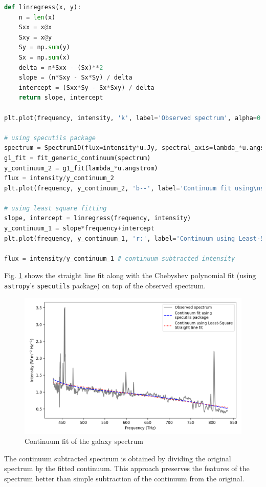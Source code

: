 \begin{lstlisting}[language=Python, caption=Implementation of Linear Regression for straight line fitting compared with the standard specutils library generic continuum fit]
def linregress(x, y):
    n = len(x)
    Sxx = x@x
    Sxy = x@y
    Sy = np.sum(y)
    Sx = np.sum(x)
    delta = n*Sxx - (Sx)**2
    slope = (n*Sxy - Sx*Sy) / delta
    intercept = (Sxx*Sy - Sx*Sxy) / delta
    return slope, intercept

plt.plot(frequency, intensity, 'k', label='Observed spectrum', alpha=0.5)  

# using specutils package
spectrum = Spectrum1D(flux=intensity*u.Jy, spectral_axis=lambda_*u.angstrom)
g1_fit = fit_generic_continuum(spectrum)
y_continuum_2 = g1_fit(lambda_*u.angstrom)
flux = intensity/y_continuum_2
plt.plot(frequency, y_continuum_2, 'b--', label='Continuum fit using\nspecutils package')

# using least square fitting
slope, intercept = linregress(frequency, intensity)
y_continuum_1 = slope*frequency+intercept
plt.plot(frequency, y_continuum_1, 'r:', label='Continuum using Least-Square\nStraight line fit')

flux = intensity/y_continuum_1 # continuum subtracted intensity
\end{lstlisting}

Fig. \ref{continuum} shows the straight line fit along with the Chebyshev polynomial fit (using \verb|astropy|'s \verb|specutils| package) on top of the observed spectrum.

\begin{figure}[H]
    \centering
    \includegraphics[width=0.7\linewidth]{Figures/3/continuum.png}
    \caption{Continuum fit of the galaxy spectrum}
    \label{continuum}
\end{figure}

The continuum subtracted spectrum is obtained by dividing the original spectrum by the fitted continuum. This approach preserves the features of the spectrum better than simple subtraction of the continuum from the original.

